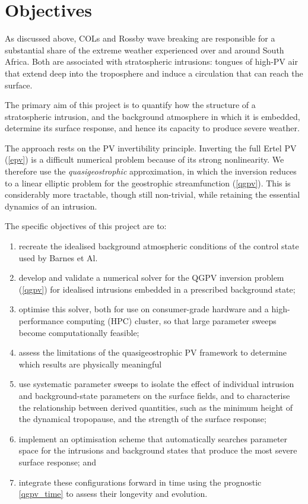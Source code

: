 \documentclass{article}
\begin{document}
\section{Objectives}\label{sec:objectives}

As discussed above, COLs and Rossby wave breaking are responsible for a substantial share of the extreme weather experienced over and around South Africa.
Both are associated with stratospheric intrusions: tongues of high-PV air that extend deep into the troposphere and induce a circulation that can reach the surface.

The primary aim of this project is to quantify how the structure of a stratospheric intrusion, and the background atmosphere in which it is embedded, determine its surface response, and hence its capacity to produce severe weather.

The approach rests on the PV invertibility principle.
Inverting the full Ertel PV (\cref{epv}) is a difficult numerical problem because of its strong nonlinearity.
We therefore use the
\textit{quasigeostrophic} approximation, in which the inversion reduces to a linear elliptic problem for the geostrophic streamfunction (\cref{qgpv}).
This is considerably more tractable, though still non-trivial, while retaining the essential dynamics of an intrusion.

The specific objectives of this project are to:
\begin{enumerate}
  \item recreate the idealised background atmospheric conditions of the control state used by Barnes et Al. \cite{Barnes2022main}

  \item develop and validate a numerical solver for the QGPV inversion problem (\cref{qgpv}) for idealised intrusions embedded in a prescribed background state;
  
  \item optimise this solver, both for use on consumer-grade hardware and a high-performance computing (HPC) cluster, so that large parameter sweeps become computationally feasible;

  \item assess the limitations of the quasigeostrophic PV framework to determine which results are physically meaningful
  
  \item use systematic parameter sweeps to isolate the effect of individual intrusion and background-state parameters on the surface fields, and to characterise the relationship between derived quantities, such as the minimum height of the dynamical tropopause, and the strength of the surface response;
  
  \item implement an optimisation scheme that automatically searches parameter space for the intrusions and background states that produce the most severe surface response; and
  
  \item integrate these configurations forward in time using the prognostic \cref{qgpv_time} to assess their longevity and evolution.
\end{enumerate}
\end{document}
